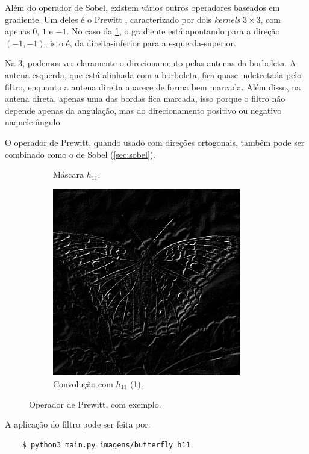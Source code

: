 Além do operador de Sobel, existem vários outros operadores baseados em gradiente. Um deles é o Prewitt \autocite{ref:prewitt}, caracterizado por dois \textit{kernels} $3 \times 3$, com apenas $0$, $1$ e $-1$. No caso da \cref{fig:h11}, o gradiente está apontando para a direção $(-1, -1)$, isto é, da direita-inferior para a esquerda-superior.

Na \cref{fig:grad}, podemos ver claramente o direcionamento pelas antenas da borboleta. A antena esquerda, que está alinhada com a borboleta, fica quase indetectada pelo filtro, enquanto a antena direita aparece de forma bem marcada. Além disso, na antena direta, apenas uma das bordas fica marcada, isso porque o filtro não depende apenas da angulação, mas do direcionamento positivo ou negativo naquele ângulo.

O operador de Prewitt, quando usado com direções ortogonais, também pode ser combinado como o de Sobel (\cref{sec:sobel}).

\begin{figure}[H]
    \centering
    \begin{subfigure}{0.48\textwidth}
        \centering
        

        \caption{Máscara $h_{11}$.}
        \label{fig:h11}
    \end{subfigure}%
    \begin{subfigure}{0.48\textwidth}
        \centering
        \includegraphics[width=0.9\textwidth]{resultados/butterfly_h11.png}
        \caption{Convolução com $h_{11}$ (\ref{fig:h11}).}
        \label{fig:grad}
    \end{subfigure}

    \caption{Operador de Prewitt, com exemplo.}
\end{figure}

A aplicação do filtro pode ser feita por:

\begin{verbatim}
    $ python3 main.py imagens/butterfly h11
\end{verbatim}
